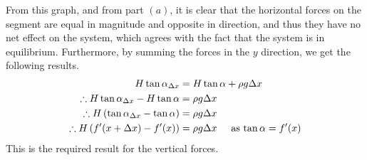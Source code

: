 \documentclass[a4paper]{article}
\begin{document}
\begin{enumerate}[label=\textbf{\arabic*.}]
\begin{enumerate}
		From this graph, and from part $\displaystyle{(a)}$, it is clear that the horizontal forces on the segment are equal in magnitude and opposite in direction, and thus they have no net effect on the system, which agrees with the fact that the system is in equilibrium. Furthermore, by summing the forces in the $\displaystyle{y}$ direction, we get the following results.
		\begin{align*}
		H\tan{\alpha_{\Delta x}} & = H\tan{\alpha} + \rho g \Delta x\\
		\therefore H\tan{\alpha_{\Delta x}} - H\tan{\alpha} & = \rho g \Delta x\\
		\therefore H\left(\tan{\alpha_{\Delta x}} - \tan{\alpha} \right) & = \rho g \Delta x\\
		\therefore H\left(f^{\prime}(x+\Delta x) - f^{\prime}(x) \right) & = \rho g \Delta x \hspace{5mm} \text{as $\displaystyle{\tan{\alpha} = f^{\prime}(x)}$}\\
		\end{align*}
		This is the required result for the vertical forces.

		\pagebreak


\end{enumerate}
\end{enumerate}
\end{document}
